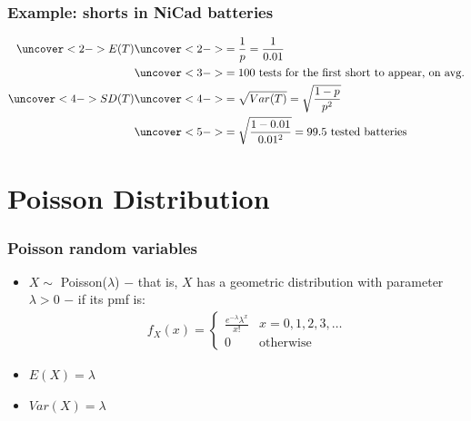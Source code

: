 \documentclass[handout]{beamer}\usepackage{graphicx, color}
\numberwithin{equation}{section}
\begin{document}
\begin{frame}
\frametitle{Example: shorts in NiCad batteries}
\begin{align*}
\uncover<2->{E(T)} & \uncover<2->{ = \frac{1}{p} = \frac{1}{0.01}} \\
&\uncover<3->{ = 100 \text{ tests for the first short to appear, on avg.}} \\
\uncover<4->{ SD(T)} &\uncover<4->{ = \sqrt{Var(T)} = \sqrt{\frac{1-p}{p^2}}} \\
& \uncover<5->{=  \sqrt{\frac{1-0.01}{0.01^2}} = 99.5 \text{ tested batteries}}
\end{align*}
\end{frame}






\section{ Poisson Distribution}


\begin{frame}
\frametitle{Poisson random variables}
\begin{itemize}
\pause \item $X \sim $ Poisson($\lambda$) $-$ that is, $X$ has a geometric distribution with parameter $\lambda > 0$ $-$ if its pmf is:
\pause \begin{align*}
f_X(x) = \begin{cases}
\frac{e^{-\lambda}\lambda^x}{x!} & x = 0,1 , 2, 3, \ldots \\
0 & \text{otherwise}
\end{cases}
\end{align*}
\pause \item $E(X) = \lambda$
\pause \item $Var(X) = \lambda$
\end{itemize}
\end{frame}
\end{document}

